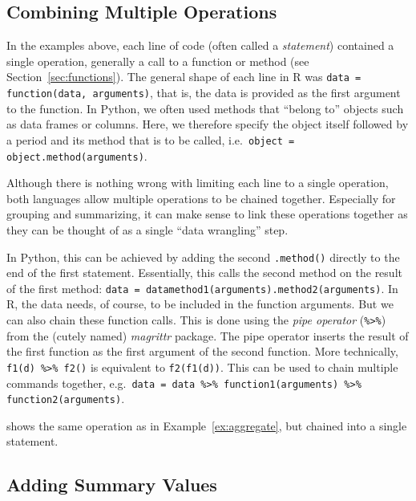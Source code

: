 \subsection{Combining Multiple Operations}

In the examples above, each line of code (often called a \emph{statement}) contained a single operation, generally a call to a function or method (see Section~\ref{sec:functions}).
The general shape of each line in R was \verb+data = function(data, arguments)+, that is, the data is provided as the first argument to the function.
In Python, we often used methods that ``belong to'' objects such as data frames or columns. Here, we therefore specify the object itself followed by a period and its method that is to be called,
i.e.\ \verb+object = object.method(arguments)+.

Although there is nothing wrong with limiting each line to a single operation, both languages allow multiple operations to be chained together.
Especially for grouping and summarizing, it can make sense to link these operations together as they can be thought of as a single ``data wrangling'' step.

In Python, this can be achieved by adding the second \verb+.method()+ directly to the end of the first statement.
Essentially, this calls the second method on the result of the first method: \verb+data = datamethod1(arguments).method2(arguments)+.
In R, the data needs, of course, to be included in the function arguments. But we can also chain these function calls.
This is done using the \emph{pipe operator} (\verb+%>%+) from the (cutely named) \emph{magrittr} package.
The pipe operator inserts the result of the first function as the first argument of the second function.
More technically, \verb|f1(d) %>% f2()| is equivalent to \verb|f2(f1(d))|.
This can be used to chain multiple commands together, e.g.\ \verb+data = data %>% function1(arguments) %>% function2(arguments)+.


 shows the same operation as in Example~\ref{ex:aggregate}, but chained into a single statement.


\subsection{Adding Summary Values}

